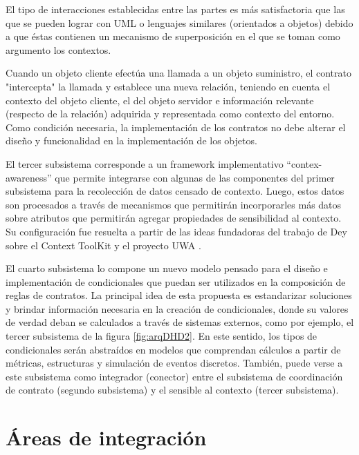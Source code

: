 {


El tipo de interacciones establecidas entre las partes es más satisfactoria que las que se pueden lograr con UML o lenguajes similares (orientados a objetos) debido a que éstas contienen un mecanismo de superposición en el que se toman como argumento los contextos. 

Cuando un objeto cliente efectúa una llamada a un objeto suministro, el contrato "intercepta"  la llamada y establece una nueva relación, teniendo en cuenta el contexto del objeto cliente, el del objeto servidor e información relevante (respecto de la relación) adquirida y representada como contexto del entorno. Como condición necesaria, la implementación de los contratos no debe alterar el diseño y funcionalidad en la implementación de los objetos.


El tercer subsistema corresponde a un framework implementativo “contex-awareness” que permite integrarse con algunas de las componentes del primer subsistema para la recolección de datos censado de contexto. Luego, estos datos son procesados a través de mecanismos que permitirán incorporarles más datos sobre atributos que permitirán agregar propiedades de sensibilidad al contexto. Su configuración fue resuelta a partir de las ideas fundadoras del trabajo de Dey sobre el Context ToolKit \cite{arqDHD15} y el proyecto UWA \cite{arqDHD16}.


El cuarto subsistema lo compone un nuevo modelo pensado para el diseño e implementación de condicionales que puedan ser utilizados en la composición de reglas de contratos. La principal idea de esta propuesta es estandarizar soluciones y brindar información necesaria en la creación de condicionales, donde su valores de verdad deban se calculados a través de sistemas externos, como por
ejemplo, el tercer subsistema de la figura \ref{fig:arqDHD2}. En este sentido, los tipos de condicionales serán abstraídos en modelos que comprendan cálculos a partir de métricas, estructuras y simulación de eventos discretos. También, puede verse a este subsistema como integrador (conector) entre el subsistema de coordinación de contrato (segundo subsistema) y el sensible al contexto (tercer subsistema).



\section{Áreas de integración}


}
